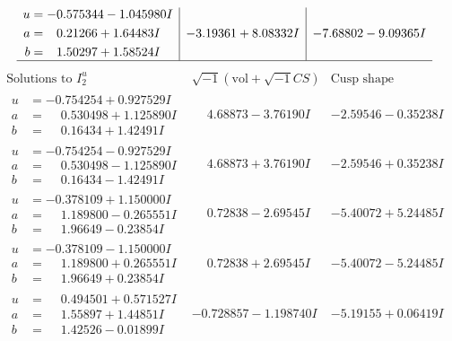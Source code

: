 \documentclass[1p]{elsarticle_modified}
\theoremstyle{definition}
\newcommand{\I}{\sqrt{-1}}
\begin{document}
$$\begin{array}{c|c|c}
\begin{aligned}
u &= -0.575344 - 1.045980 I \\
a &= \phantom{-}0.21266 + 1.64483 I \\
b &= \phantom{-}1.50297 + 1.58524 I\end{aligned}
 & -3.19361 + 8.08332 I & -7.68802 - 9.09365 I\\
 \hline 
 \end{array}$$\newpage$$\begin{array}{c|c|c}  
\text{Solutions to }I^u_{2}& \I (\text{vol} + \sqrt{-1}CS) & \text{Cusp shape}\\
 \hline 
\begin{aligned}
u &= -0.754254 + 0.927529 I \\
a &= \phantom{-}0.530498 + 1.125890 I \\
b &= \phantom{-}0.16434 + 1.42491 I\end{aligned}
 & \phantom{-}4.68873 - 3.76190 I & -2.59546 - 0.35238 I \\ \hline\begin{aligned}
u &= -0.754254 - 0.927529 I \\
a &= \phantom{-}0.530498 - 1.125890 I \\
b &= \phantom{-}0.16434 - 1.42491 I\end{aligned}
 & \phantom{-}4.68873 + 3.76190 I & -2.59546 + 0.35238 I \\ \hline\begin{aligned}
u &= -0.378109 + 1.150000 I \\
a &= \phantom{-}1.189800 - 0.265551 I \\
b &= \phantom{-}1.96649 - 0.23854 I\end{aligned}
 & \phantom{-}0.72838 - 2.69545 I & -5.40072 + 5.24485 I \\ \hline\begin{aligned}
u &= -0.378109 - 1.150000 I \\
a &= \phantom{-}1.189800 + 0.265551 I \\
b &= \phantom{-}1.96649 + 0.23854 I\end{aligned}
 & \phantom{-}0.72838 + 2.69545 I & -5.40072 - 5.24485 I \\ \hline\begin{aligned}
u &= \phantom{-}0.494501 + 0.571527 I \\
a &= \phantom{-}1.55897 + 1.44851 I \\
b &= \phantom{-}1.42526 - 0.01899 I\end{aligned}
 & -0.728857 - 1.198740 I & -5.19155 + 0.06419 I \\ \hline\begin{aligned}

\end{aligned}
\end{array}$$
\end{document}

